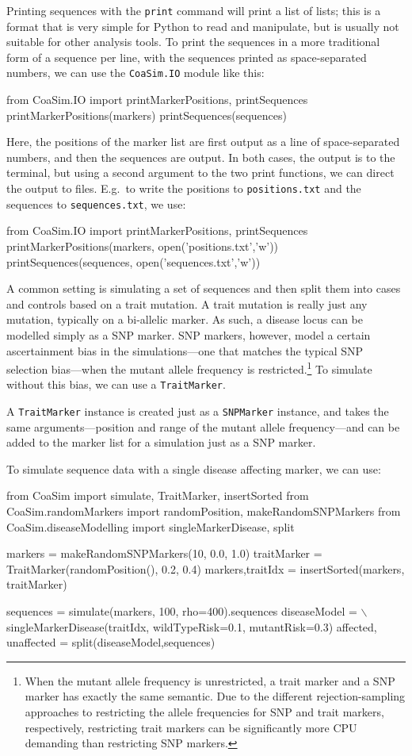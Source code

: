 \documentclass{manual}
\begin{document}
Printing sequences with the \texttt{print} command will print a list
of lists; this is a format that is very simple for Python to read and
manipulate, but is usually not suitable for other analysis tools.  To
print the sequences in a more traditional form of a sequence per line,
with the sequences printed as space-separated numbers, we can use the
\texttt{CoaSim.IO} module like this:
\begin{code}
from CoaSim.IO import printMarkerPositions, printSequences
printMarkerPositions(markers)
printSequences(sequences)
\end{code}
Here, the positions of the marker list are first output as a line of
space-separated numbers, and then the sequences are output.  In both
cases, the output is to the terminal, but using a second argument to
the two print functions, we can direct the output to files.  E.g.\ to
write the positions to \texttt{positions.txt} and the sequences to
\texttt{sequences.txt}, we use:
\begin{code}
from CoaSim.IO import printMarkerPositions, printSequences
printMarkerPositions(markers, open('positions.txt','w'))
printSequences(sequences, open('sequences.txt','w'))
\end{code}

A common setting is simulating a set of sequences and then split them
into cases and controls based on a trait mutation.  A trait mutation
is really just any mutation, typically on a bi-allelic marker.  As
such, a disease locus can be modelled simply as a SNP marker.  SNP
markers, however, model a certain ascertainment bias in the
simulations---one that matches the typical SNP selection bias---when
the mutant allele frequency is restricted.\footnote{When the mutant
  allele frequency is unrestricted, a trait marker and a SNP marker
  has exactly the same semantic.  Due to the different
  rejection-sampling approaches to restricting the allele frequencies
  for SNP and trait markers, respectively, restricting trait markers
  can be significantly more CPU demanding than restricting SNP
  markers.}  To simulate without this bias, we can use a
\texttt{TraitMarker}.

A \texttt{TraitMarker} instance is created just as a
\texttt{SNPMarker} instance, and takes the same arguments---position
and range of the mutant allele frequency---and can be added to the
marker list for a simulation just as a SNP marker.

To simulate sequence data with a single disease affecting marker, we
can use:
\begin{code}
from CoaSim import simulate, TraitMarker, insertSorted
from CoaSim.randomMarkers import randomPosition, makeRandomSNPMarkers
from CoaSim.diseaseModelling import singleMarkerDisease, split

markers = makeRandomSNPMarkers(10, 0.0, 1.0)
traitMarker = TraitMarker(randomPosition(), 0.2, 0.4)
markers,traitIdx = insertSorted(markers, traitMarker)

sequences = simulate(markers, 100, rho=400).sequences
diseaseModel = \(\backslash\)
    singleMarkerDisease(traitIdx, wildTypeRisk=0.1, mutantRisk=0.3)
affected, unaffected = split(diseaseModel,sequences)
\end{code}
\end{document}
